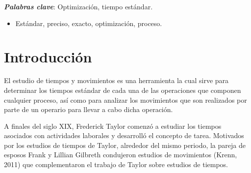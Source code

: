     \maketitle
    \thispagestyle{fancy}
    
    
    
    \begin{abstract}
    \noindent         
    \end{abstract}
    \textbf{\textit{Palabras clave}}: {Optimización, tiempo estándar.}
    \begin{itemize}
        \item Estándar, preciso, exacto, optimización, proceso.
    \end{itemize}
    
    \section{Introducción}
    
    
    El estudio de tiempos y movimientos es una herramienta la cual sirve para determinar los tiempos estándar de cada una de las operaciones que componen cualquier proceso, así como para analizar los movimientos que son realizados por parte de un operario para llevar a cabo dicha operación.
    
    A finales del siglo XIX, Frederick Taylor comenzó a estudiar los tiempos asociados con actividades laborales y desarrolló el concepto de tarea. Motivados por los estudios de tiempos de Taylor, alrededor del mismo periodo, la pareja de esposos Frank y Lillian Gilbreth condujeron estudios de movimientos (Krenn, 2011) que complementaron el trabajo de Taylor sobre estudios de tiempos.\cite{andrade2019estudio}
    
